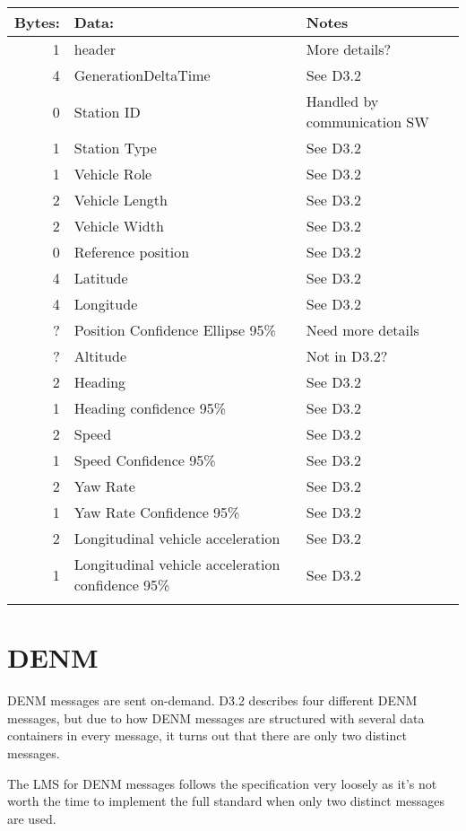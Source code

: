 \documentclass[11pt]{article}
\begin{document}
\begin{center}
\begin{tabular}{rll}
\hline
Bytes: & Data: & Notes\\
\hline
1 & header & More details?\\
4 & GenerationDeltaTime & See D3.2\\
0 & Station ID & Handled by communication SW\\
1 & Station Type & See D3.2\\
1 & Vehicle Role & See D3.2\\
2 & Vehicle Length & See D3.2\\
2 & Vehicle Width & See D3.2\\
0 & Reference position & See D3.2\\
4 & Latitude & See D3.2\\
4 & Longitude & See D3.2\\
? & Position Confidence Ellipse 95\% & Need more details\\
? & Altitude & Not in D3.2?\\
2 & Heading & See D3.2\\
1 & Heading confidence 95\% & See D3.2\\
2 & Speed & See D3.2\\
1 & Speed Confidence 95\% & See D3.2\\
2 & Yaw Rate & See D3.2\\
1 & Yaw Rate Confidence 95\% & See D3.2\\
2 & Longitudinal vehicle acceleration & See D3.2\\
1 & Longitudinal vehicle acceleration confidence 95\% & See D3.2\\
 &  & \\
\end{tabular}
\end{center}



\section{DENM}
\label{sec:orgheadline3}
DENM messages are sent on-demand. D3.2 describes four different DENM
messages, but due to how DENM messages are structured with several
data containers in every message, it turns out that there are only two
distinct messages.

The LMS for DENM messages follows the specification very loosely as
it's not worth the time to implement the full standard when only two
distinct messages are used. 
\end{document}
